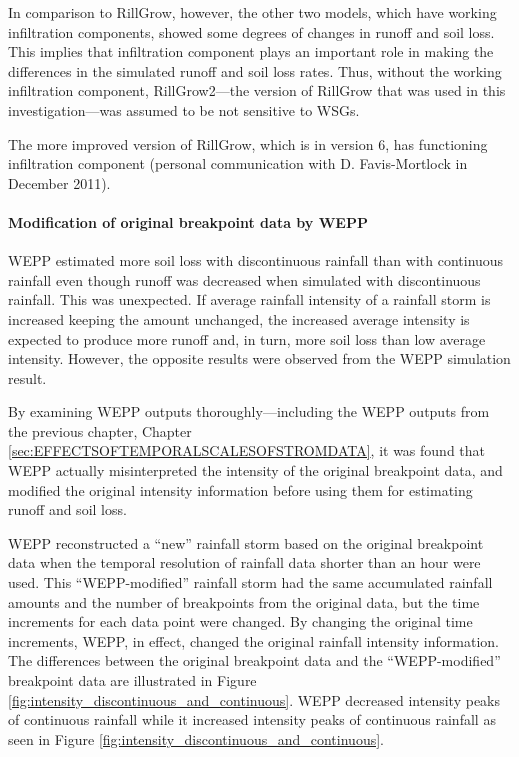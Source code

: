 In comparison to RillGrow, however, the other two models, which have working
infiltration components, showed some degrees of changes in runoff and soil loss.
This implies that infiltration component plays an important role in making the
differences in the simulated runoff and soil loss rates. Thus, without the
working infiltration component, RillGrow2---the version of RillGrow that was
used in this investigation---was assumed to be not sensitive to WSGs.

The more improved version of RillGrow, which is in version 6, has functioning
infiltration component (personal communication with D. Favis-Mortlock in
December 2011).

\paragraph{Modification of original breakpoint data by WEPP}
\label{sec:WEPPModificationofBP} WEPP estimated more
soil loss with discontinuous rainfall than with continuous rainfall even though
runoff was decreased when simulated with discontinuous rainfall. This was
unexpected. If average rainfall intensity of a rainfall storm is
increased keeping the amount unchanged, the increased average intensity is
expected to produce more runoff and, in turn, more soil loss than low average
intensity. However, the opposite results were observed from the WEPP simulation
result.

By examining WEPP outputs thoroughly---including the WEPP outputs from
the previous chapter, Chapter \ref{sec:EFFECTSOFTEMPORALSCALESOFSTROMDATA}, it
was found that WEPP actually misinterpreted the intensity of the original
breakpoint data, and modified the original intensity
information before using them for estimating runoff and soil loss.

WEPP reconstructed a ``new'' rainfall storm based on the original breakpoint
data when the temporal resolution of rainfall data shorter than an hour were used.
This ``WEPP-modified'' rainfall storm had the same accumulated rainfall
amounts and the number of breakpoints from the original data, but the time
increments for each data point were changed. By changing the original time
increments, WEPP, in effect, changed the original rainfall intensity
information. The differences between the original breakpoint data and the
``WEPP-modified'' breakpoint data are illustrated in Figure
\ref{fig:intensity_discontinuous_and_continuous}. WEPP decreased intensity peaks
of continuous rainfall while it increased intensity peaks of continuous rainfall
as seen in Figure \ref{fig:intensity_discontinuous_and_continuous}.

